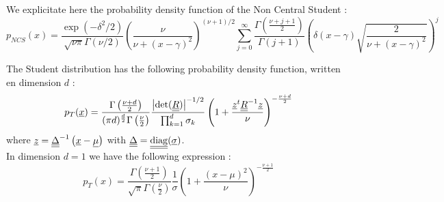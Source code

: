 We explicitate here the probability density function of the Non Central Student :
$$
p_{NCS}(x) = \frac{\exp(-\delta^2 / 2)}{\sqrt{\nu\pi} \Gamma(\nu / 2)}\left(\frac{\nu}{\nu + (x-\gamma)^2}\right) ^ {(\nu + 1) / 2} \sum_{j=0}^{\infty} \frac{\Gamma\left(\frac{\nu + j + 1}{2}\right)}{\Gamma(j + 1)}\left(\delta(x-\gamma)\sqrt{\frac{2}{\nu + (x-\gamma)^2}}\right) ^ j
$$

The Student distribution has the following  probability density function, written en dimension $d$ :
$$
p_T({\underline{x}}) = \frac{\Gamma\left(\frac{\nu+d}{2}\right)}
{(\pi d)^{\frac{d}{2}}\Gamma\left(\frac{\nu}{2}\right)}\frac{\left|\mathrm{det}({\underline{\underline{R}}})\right|^{-1/2}}{\prod_{k=1}^d\sigma_k}\left(1+\frac{{\underline{z}}^t{\underline{\underline{R}}}^{-1}{\underline{z}}}{\nu}\right)^{-\frac{\nu+d}{2}}
$$
where ${\underline{z}}={\underline{\underline{\Delta}}}^{-1}\left({\underline{x}}-{\underline{\mu}}\right)$ with ${\underline{\underline{\Delta}}}={\underline{\underline{\mathrm{diag}}}}({\underline{\sigma}})$.\\

In dimension $d=1$ we have the following expression :
$$
\displaystyle p_T(x) = \frac{\Gamma\left(\frac{\nu+1}{2}\right)}
{\sqrt{\pi}\Gamma\left(\frac{\nu}{2}\right)}\frac{1}{\sigma}\left(1+\frac{(x-\mu)^2}{\nu}\right)^{-\frac{\nu+1}{2}}
$$


